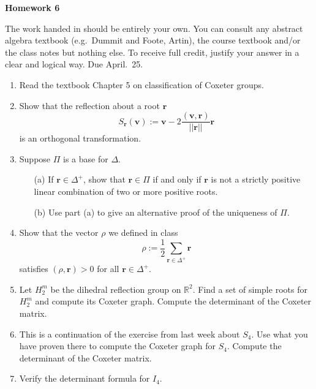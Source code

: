 \documentclass[12pt]{article}
\title{}
\date{}
\theoremstyle{plain}
\theoremstyle{definition}
\theoremstyle{remark}
\newcommand{\R}{\mathbb{R}}
\begin{document}
\begin{center}
{\Large \bf Homework 6}
\end{center}
The work handed in should be entirely your own. You can consult any abstract algebra textbook (e.g.~Dummit and Foote, Artin), the course textbook and/or the class notes but nothing else. To receive full credit, justify your answer in a clear and logical way. Due April.~25.

\begin{enumerate}
\item Read the textbook Chapter 5 on classification of Coxeter groups.
\item Show that the reflection about a root $\mathbf{r}$
\[
S_{\mathbf{r}}(\mathbf{v}):=\mathbf{v}-2\frac{(\mathbf{v},\mathbf{r})}{||\mathbf{r}||}\mathbf{r}
\]
is an orthogonal transformation.

\item Suppose $\Pi$ is a base for $\Delta$.
\begin{enumerate}
\item[(a)] If $\mathbf{r}\in \Delta^+$, show that $\mathbf{r}\in \Pi$ if and only if $\mathbf{r}$ is not a strictly positive linear combination of two or more positive roots.
\item[(b)] Use part (a) to give an alternative proof of the uniqueness of $\Pi$.
\end{enumerate}

\item Show that the vector $\rho$ we defined in class
\[
\rho:=\frac{1}{2}\sum_{\mathbf{r}\in \Delta^+} \mathbf{r}
\]
satisfies $(\rho,\mathbf{r})>0$ for all $\mathbf{r}\in \Delta^+$.

\item Let $H_2^m$ be the dihedral reflection group on $\R^2$. Find a set of simple roots for $H_2^m$ and compute its Coxeter graph. Compute the determinant of the Coxeter matrix.

\item This is a continuation of the exercise from last week about $S_4$. Use what you have proven there to compute the Coxeter graph for $S_4$. Compute the determinant of the Coxeter matrix. 

\item Verify the determinant formula for $I_4$.




\end{enumerate}
\end{document}
